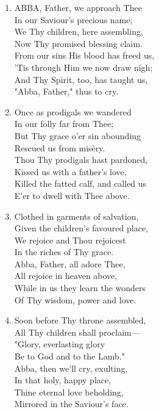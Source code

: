 \documentclass[11pt,a4paper]{article}
\begin{document}
\begin{enumerate}
    \item ABBA, Father, we approach Thee \\
        In our Saviour's precious name; \\
        We Thy children, here assembling, \\
        Now Thy promised blessing claim. \\
        From our sins His blood has freed us, \\
        'Tis through Him we now draw nigh; \\
        And Thy Spirit, too, has taught us, \\
        "Abba, Father," thus to cry.

    \item Once as prodigals we wandered \\
        In our folly far from Thee; \\
        But Thy grace o'er sin abounding \\
        Rescued us from mis\`ery. \\
        Thou Thy prodigals hast pardoned, \\
        Kissed us with a father's love, \\
        Killed the fatted calf, and called us \\
        E'er to dwell with Thee above.

    \item Clothed in garments of salvation, \\
        Given the children's favoured place, \\
        We rejoice and Thou rejoicest \\
        In the riches of Thy grace. \\
        Abba, Father, all adore Thee, \\
        All rejoice in heaven above, \\
        While in us they learn the wonders \\
        Of Thy wisdom, power and love.

    \item Soon before Thy throne assembled, \\
        All Thy children shall proclaim--- \\
        "Glory, everlasting glory \\
        Be to God and to the Lamb." \\
        Abba, then we'll cry, exulting, \\
        In that holy, happy place, \\
        Thine eternal love beholding, \\
        Mirrored in the Saviour's face.

\end{enumerate}
\end{document}
